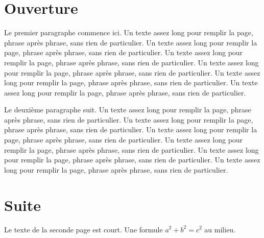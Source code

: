 \documentclass{article}
\begin{document}
\section{Ouverture}
Le premier paragraphe commence ici. Un texte assez long pour remplir la page, phrase après phrase, sans rien de particulier. Un texte assez long pour remplir la page, phrase après phrase, sans rien de particulier. Un texte assez long pour remplir la page, phrase après phrase, sans rien de particulier. Un texte assez long pour remplir la page, phrase après phrase, sans rien de particulier. Un texte assez long pour remplir la page, phrase après phrase, sans rien de particulier. Un texte assez long pour remplir la page, phrase après phrase, sans rien de particulier. 

Le deuxième paragraphe suit. Un texte assez long pour remplir la page, phrase après phrase, sans rien de particulier. Un texte assez long pour remplir la page, phrase après phrase, sans rien de particulier. Un texte assez long pour remplir la page, phrase après phrase, sans rien de particulier. Un texte assez long pour remplir la page, phrase après phrase, sans rien de particulier. Un texte assez long pour remplir la page, phrase après phrase, sans rien de particulier. Un texte assez long pour remplir la page, phrase après phrase, sans rien de particulier. 

\newpage
\section{Suite}
Le texte de la seconde page est court.
Une formule $a^2 + b^2 = c^2$ au milieu.
\end{document}
